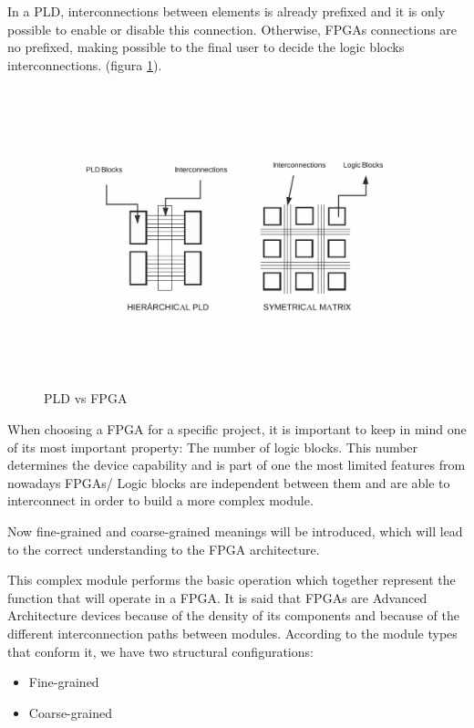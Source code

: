 In a PLD, interconnections between elements is already prefixed and it is only possible to enable or disable this connection. Otherwise, FPGAs connections are no prefixed, making possible to the final user to decide the logic blocks interconnections. (figura \ref{fig:pld_fpga}).
\newline
\begin{center}
\begin{figure}[H]
	\center
	\includegraphics[trim = 10mm 35mm 10mm 35mm, clip,scale=0.4]{imagenes/EstadoArte/pld_fpga.pdf}
	\caption{PLD vs FPGA}
	\label{fig:pld_fpga}
\end{figure}

\end{center}

When choosing a FPGA for a specific project, it is important to keep in mind one of its most important property: The number of logic blocks. This number determines the device capability and is part of one the most limited features from nowadays FPGAs/ Logic blocks are independent between them and are able to interconnect in order to build a more complex module. \newline

Now fine-grained and coarse-grained meanings will be introduced, which will lead to the correct understanding to the FPGA architecture. 

This complex module performs the basic operation which together represent the function that will operate in a FPGA. It is said that FPGAs are Advanced Architecture devices because of the density of its components and because of the different interconnection paths between modules. According to the module types that conform it, we have two structural configurations:
\begin{itemize}
	\item Fine-grained
	\item Coarse-grained
\end{itemize}


